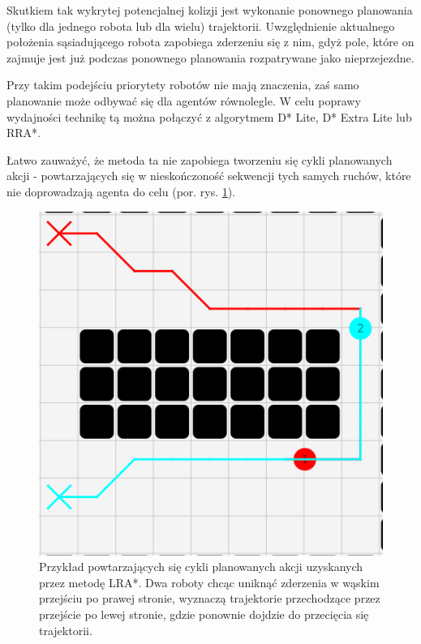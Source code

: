 
Skutkiem tak wykrytej potencjalnej kolizji jest wykonanie ponownego planowania (tylko dla jednego robota lub dla wielu) trajektorii. Uwzględnienie aktualnego położenia sąsiadującego robota zapobiega zderzeniu się z nim, gdyż pole, które on zajmuje jest już podczas ponownego planowania rozpatrywane jako nieprzejezdne.

Przy takim podejściu priorytety robotów nie mają znaczenia, zaś samo planowanie może odbywać się dla agentów równolegle.
W celu poprawy wydajności technikę tą można połączyć z algorytmem D* Lite, D* Extra Lite lub RRA*.

Łatwo zauważyć, że metoda ta nie zapobiega tworzeniu się cykli planowanych akcji - powtarzających się w nieskończoność sekwencji tych samych ruchów, które nie doprowadzają agenta do celu (por. rys. \ref{fig:robopath-lra-cycle}).

\begin{figure}
	\centering
	\includegraphics[width=0.5\columnwidth]{img/robopath/lra-cycle}
	\caption{Przykład powtarzających się cykli planowanych akcji uzyskanych przez metodę LRA*. Dwa roboty chcąc uniknąć zderzenia w wąskim przejściu po prawej stronie, wyznaczą trajektorie przechodzące przez przejście po lewej stronie, gdzie ponownie dojdzie do przecięcia się trajektorii.}
	\label{fig:robopath-lra-cycle}
\end{figure}
